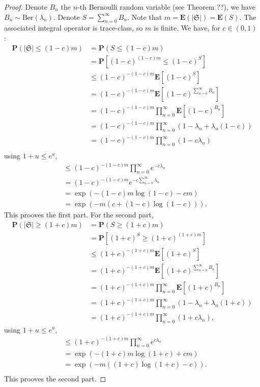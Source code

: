 \documentclass[11pt]{article}
\theoremstyle{plain}
\theoremstyle{definition}
\begin{document}
\begin{proof}
Denote $B_n$ the $n$-th Bernoulli random variable (see Theorem ??), we have $ B_n \sim \mathrm{Ber} (\lambda_n) $. Denote $ S=\sum\limits_{n=0}^\infty B_n$. Note that $m = \mathbf E(|\mathfrak S |) = \mathbf E(S)$. The associated integral operator is trace-class, so $m$ is finite. We have, for $ c \in (0,1) $ :
\begin{align*}
    \mathbf P( | \mathfrak S | \leqslant (1-c)m ) &= \mathbf P( S \leqslant (1-c)m ) \\
    &= \mathbf P\left[ (1-c)^{(1-c)m} \leqslant (1-c)^{S} \right] \\
    &\leqslant (1-c)^{-(1-c)m} \mathbf E[(1-c)^{S} ] \\
    &= (1-c)^{-(1-c)m} \mathbf E\left[ (1-c)^{\sum\limits_{n=0}^\infty B_n} \right] \\
    &= (1-c)^{-(1-c)m} \prod_{n=0}^\infty \mathbf E[ (1-c)^{B_n} ] \\
    &= (1-c)^{-(1-c)m} \prod_{n=0}^\infty (1-\lambda_n + \lambda_n(1-c)) \\
    &= (1-c)^{-(1-c)m} \prod_{n=0}^\infty (1-c\lambda_n) \\
\end{align*}
using $ 1+u \leqslant e^u $,
\begin{align*}
    &\leqslant (1-c)^{-(1-c)m} \prod_{n=0}^\infty e^{-c\lambda_n} \\
    &= (1-c)^{-(1-c)m} e^{-c \sum\limits_{n=0}^\infty \lambda_n} \\
    &= \exp(-(1-c)m \log(1-c) -c m) \\
    &= \exp(-m (c + (1-c) \log(1-c) )).
\end{align*}
This prooves the first part. For the second part,
\begin{align*}
    \mathbf P( | \mathfrak S | \geqslant (1+c)m ) &= \mathbf P( S \geqslant (1+c)m ) \\
    &= \mathbf P\left[ (1+c)^{S} \geqslant (1+c)^{(1+c)m} \right] \\
    &\leqslant (1+c)^{-(1+c)m} \mathbf E[(1+c)^{S} ] \\
    &= (1+c)^{-(1+c)m} \mathbf E\left[ (1+c)^{\sum\limits_{n=0}^\infty B_n} \right] \\
    &= (1+c)^{-(1+c)m} \prod_{n=0}^\infty \mathbf E[ (1+c)^{B_n} ] \\
    &= (1+c)^{-(1+c)m} \prod_{n=0}^\infty (1-\lambda_n + \lambda_n(1+c)) \\
    &= (1+c)^{-(1+c)m} \prod_{n=0}^\infty (1+c\lambda_n),
\end{align*}
using $ 1+u \leqslant e^u $,
\begin{align*}
    &\leqslant (1+c)^{-(1+c)m} \prod_{n=0}^\infty e^{c\lambda_n} \\
    &= \exp(-(1+c)m \log(1+c) +c m) \\
    &= \exp( - m ((1+c) \log(1+c) -c)). \\
\end{align*}
This prooves the second part.
\end{proof}

\newpage


\end{document}
